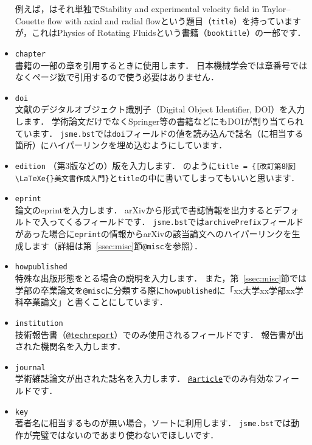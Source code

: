 \documentclass[a4paper,fleqn,uplatex,dvipdfmx]{jsarticle}
\newcommand{\jsmefile}{\texttt{jsme.bst}}
\begin{document}
\begin{itemize}
        例えば，\citet{Lueptow:Springer2000}はそれ単独でStability and experimental velocity field in Taylor--Couette flow with axial and radial flowという題目（\verb|title|）を持っていますが，これはPhysics of Rotating Fluidsという書籍（\verb|booktitle|）の一部です．
    \item \verb|chapter| \\
        書籍の一部の章を引用するときに使用します．
        日本機械学会では章番号ではなくページ数で引用するので使う必要はありません．
    \item \verb|doi| \\
        文献のデジタルオブジェクト識別子（Digital Object Identifier, DOI）を入力します．
        学術論文だけでなくSpringer等の書籍などにもDOIが割り当てられています．
        \jsmefile では\verb|doi|フィールドの値を読み込んで誌名（に相当する箇所）にハイパーリンクを埋め込むようにしています．
    \item \verb|edition|
        （第3版などの）版を入力します．
        \citet{奥村:技評2020}のように\verb|title = {［改訂第8版］\LaTeXe{}美文書作成入門}|と\verb|title|の中に書いてしまってもいいと思います．
    \item \verb|eprint| \\
        論文のeprintを入力します．
        arXivから\BibTeX{}形式で書誌情報を出力するとデフォルトで入ってくるフィールドです．
        \jsmefile では\verb|archivePrefix|フィールドがあった場合に\verb|eprint|の情報からarXivの該当論文へのハイパーリンクを生成します（詳細は第~\ref{ssec:misc}節\verb|@misc|を参照）．
    \item \verb|howpublished| \\
        特殊な出版形態をとる場合の説明を入力します．
        また，第~\ref{ssec:misc}節では学部の卒業論文を\verb|@misc|に分類する際に\verb|howpublished|に「xx大学xx学部xx学科卒業論文」と書くことにしています．
    \item \verb|institution| \\
        技術報告書（\hyperref[ssec:techreport]{\texttt{@techreport}}）でのみ使用されるフィールドです．
        報告書が出された機関名を入力します．
    \item \verb|journal| \\
        学術雑誌論文が出された誌名を入力します．
        \hyperref[ssec:article]{\texttt{@article}}でのみ有効なフィールドです．
    \item \verb|key| \\
        著者名に相当するものが無い場合，ソートに利用します．
        \jsmefile では動作が完璧ではないのであまり使わないでほしいです．

\end{itemize}
\end{document}
